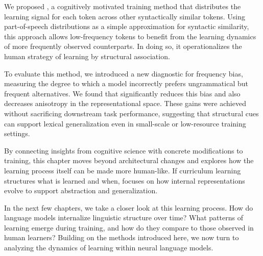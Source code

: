 We proposed \smoothing, a cognitively motivated training method that distributes the learning signal for each token across other syntactically similar tokens. Using part-of-speech distributions as a simple approximation for syntactic similarity, this approach allows low-frequency tokens to benefit from the learning dynamics of more frequently observed counterparts. In doing so, it operationalizes the human strategy of learning by structural association.

To evaluate this method, we introduced a new diagnostic for frequency bias, measuring the degree to which a model incorrectly prefers ungrammatical but frequent alternatives. We found that \smoothing significantly reduces this bias and also decreases anisotropy in the representational space. These gains were achieved without sacrificing downstream task performance, suggesting that structural cues can support lexical generalization even in small-scale or low-resource training settings.

By connecting insights from cognitive science with concrete modifications to training, this chapter moves beyond architectural changes and explores how the learning process itself can be made more human-like. If curriculum learning structures what is learned and when, \smoothing focuses on how internal representations evolve to support abstraction and generalization.

In the next few chapters, we take a closer look at this learning process. How do language models internalize linguistic structure over time? What patterns of learning emerge during training, and how do they compare to those observed in human learners? Building on the methods introduced here, we now turn to analyzing the dynamics of learning within neural language models.
